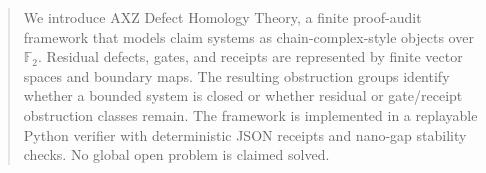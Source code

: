 \begin{abstract}
We introduce AXZ Defect Homology Theory, a finite proof-audit framework that models claim systems as chain-complex-style objects over $\mathbb F_2$. Residual defects, gates, and receipts are represented by finite vector spaces and boundary maps. The resulting obstruction groups identify whether a bounded system is closed or whether residual or gate/receipt obstruction classes remain. The framework is implemented in a replayable Python verifier with deterministic JSON receipts and nano-gap stability checks. No global open problem is claimed solved.
\end{abstract}
